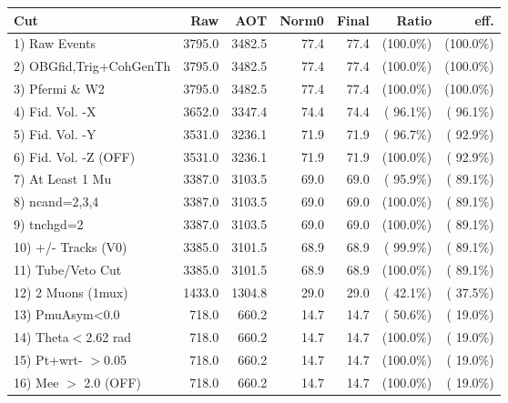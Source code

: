  \begin{table}[h!]\centering
 \begin{tabular}{||l||r|r|r|r|r|r||}
 \hline
 \hline
 Cut & Raw & AOT & Norm0 & Final & Ratio & eff.       \\
 \hline
  1) Raw Events           &       3795.0 &       3482.5 &         77.4 &         77.4 & (100.0\%) & (100.0\%) \\
  2) OBGfid,Trig+CohGenTh &       3795.0 &       3482.5 &         77.4 &         77.4 & (100.0\%) & (100.0\%) \\
  3) Pfermi \& W2         &       3795.0 &       3482.5 &         77.4 &         77.4 & (100.0\%) & (100.0\%) \\
  4) Fid. Vol. -X         &       3652.0 &       3347.4 &         74.4 &         74.4 & ( 96.1\%) & ( 96.1\%) \\
  5) Fid. Vol. -Y         &       3531.0 &       3236.1 &         71.9 &         71.9 & ( 96.7\%) & ( 92.9\%) \\
  6) Fid. Vol. -Z (OFF)   &       3531.0 &       3236.1 &         71.9 &         71.9 & (100.0\%) & ( 92.9\%) \\
  7) At Least 1 Mu        &       3387.0 &       3103.5 &         69.0 &         69.0 & ( 95.9\%) & ( 89.1\%) \\
  8) ncand=2,3,4          &       3387.0 &       3103.5 &         69.0 &         69.0 & (100.0\%) & ( 89.1\%) \\
  9) tnchgd=2             &       3387.0 &       3103.5 &         69.0 &         69.0 & (100.0\%) & ( 89.1\%) \\
 10) +/- Tracks (V0)      &       3385.0 &       3101.5 &         68.9 &         68.9 & ( 99.9\%) & ( 89.1\%) \\
 11) Tube/Veto Cut        &       3385.0 &       3101.5 &         68.9 &         68.9 & (100.0\%) & ( 89.1\%) \\
 12) 2 Muons (1mux)       &       1433.0 &       1304.8 &         29.0 &         29.0 & ( 42.1\%) & ( 37.5\%) \\
 13) PmuAsym<0.0          &        718.0 &        660.2 &         14.7 &         14.7 & ( 50.6\%) & ( 19.0\%) \\
 14) Theta$<$2.62 rad     &        718.0 &        660.2 &         14.7 &         14.7 & (100.0\%) & ( 19.0\%) \\
 15) Pt+wrt- $>$0.05      &        718.0 &        660.2 &         14.7 &         14.7 & (100.0\%) & ( 19.0\%) \\
 16) Mee $>$ 2.0  (OFF)   &        718.0 &        660.2 &         14.7 &         14.7 & (100.0\%) & ( 19.0\%) \\

\end{tabular}
\end{table}
